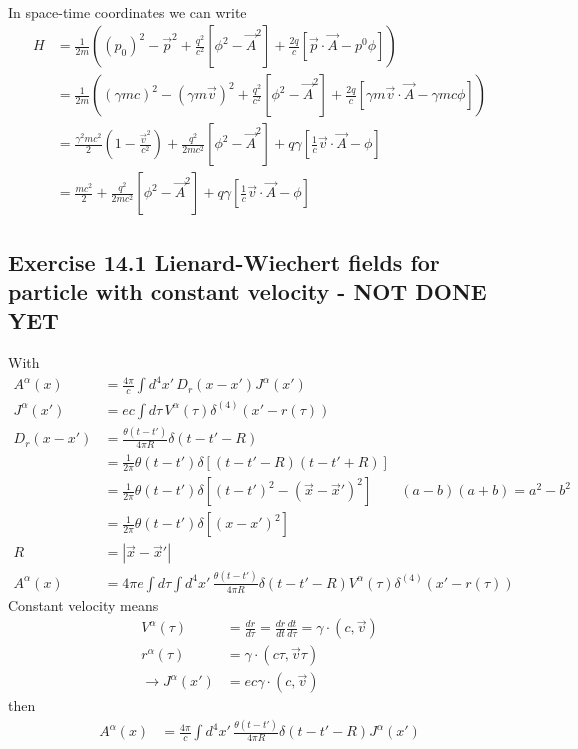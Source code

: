 \documentclass[../main.tex]{subfiles}
\begin{document}
\begin{enumerate}
\begin{align}
\end{align}
In space-time coordinates we can write
\begin{align}
H&=\frac{1}{2m}\left((p_0)^2-\vec{p}^2+\frac{q^2}{c^2}[\phi^2-\vec{A}^2]+\frac{2q}{c}[\vec{p}\cdot\vec{A}-p^0\phi]\right)\\
&=\frac{1}{2m}\left((\gamma m c)^2-(\gamma m\vec{v})^2+\frac{q^2}{c^2}[\phi^2-\vec{A}^2]+\frac{2q}{c}[\gamma m\vec{v}\cdot\vec{A}-\gamma m c\phi]\right)\\
&=\frac{\gamma^2mc^2}{2}\left(1-\frac{\vec{v}^2}{c^2}\right)+\frac{q^2}{2mc^2}[\phi^2-\vec{A}^2]+q\gamma[\frac{1}{c}\vec{v}\cdot\vec{A}- \phi]\\
&=\frac{mc^2}{2}+\frac{q^2}{2mc^2}[\phi^2-\vec{A}^2]+q\gamma[\frac{1}{c}\vec{v}\cdot\vec{A}- \phi]
\end{align}
\end{enumerate}

\subsection{Exercise 14.1 Lienard-Wiechert fields for particle with constant velocity - NOT DONE YET}
With
\begin{align}
A^\alpha(x)&=\frac{4\pi}{c}\int d^4x'\,D_r(x-x')J^\alpha(x')\\
J^\alpha(x')&=ec\int d\tau\, V^\alpha(\tau)\delta^{(4)}(x'-r(\tau))\\
D_r(x-x')&=\frac{\theta(t-t')}{4\pi R}\delta(t-t'-R)\\
&=\frac{1}{2\pi}\theta(t-t')\delta[(t-t'-R)(t-t'+R)]\\
&=\frac{1}{2\pi}\theta(t-t')\delta[(t-t')^2-(\vec{x}-\vec{x}')^2]\qquad (a-b)(a+b)=a^2-b^2\\
&=\frac{1}{2\pi}\theta(t-t')\delta[(x-x')^2]\\
R&=|\vec{x}-\vec{x}'|\\
A^\alpha(x)&=4\pi e\int d\tau\int d^4x'\,\frac{\theta(t-t')}{4\pi R}\delta(t-t'-R)V^\alpha(\tau)\delta^{(4)}(x'-r(\tau))
\end{align}
Constant velocity means 
\begin{align}
V^\alpha(\tau)&=\frac{dr}{d\tau}=\frac{dr}{dt}\frac{dt}{d\tau}=\gamma\cdot(c,\vec{v})\\
r^\alpha(\tau)&=\gamma\cdot(c\tau,\vec{v}\tau)\\
\rightarrow J^\alpha(x')&=ec\gamma\cdot(c,\vec{v})
\end{align}
then
\begin{align}
A^\alpha(x)&=\frac{4\pi}{c}\int d^4x'\,\frac{\theta(t-t')}{4\pi R}\delta(t-t'-R)J^\alpha(x')
\end{align}
\end{document}

